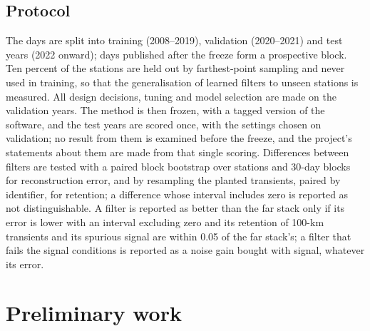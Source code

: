 \documentclass[preprint,12pt,authoryear]{elsarticle}
\begin{document}
\subsection{Protocol}
\label{sec:protocol}

The days are split into training (2008--2019), validation (2020--2021) and test years (2022 onward); days published after the freeze form a prospective block. Ten percent of the stations are held out by farthest-point sampling \citep{gonzalez1985} and never used in training, so that the generalisation of learned filters to unseen stations is measured. All design decisions, tuning and model selection are made on the validation years. The method is then frozen, with a tagged version of the software, and the test years are scored once, with the settings chosen on validation; no result from them is examined before the freeze, and the project's statements about them are made from that single scoring. Differences between filters are tested with a paired block bootstrap over stations and 30-day blocks for reconstruction error, and by resampling the planted transients, paired by identifier, for retention; a difference whose interval includes zero is reported as not distinguishable. A filter is reported as better than the far stack only if its error is lower with an interval excluding zero and its retention of 100-km transients and its spurious signal are within 0.05 of the far stack's; a filter that fails the signal conditions is reported as a noise gain bought with signal, whatever its error.

\section{Preliminary work}
\label{sec:preliminary}
\end{document}
